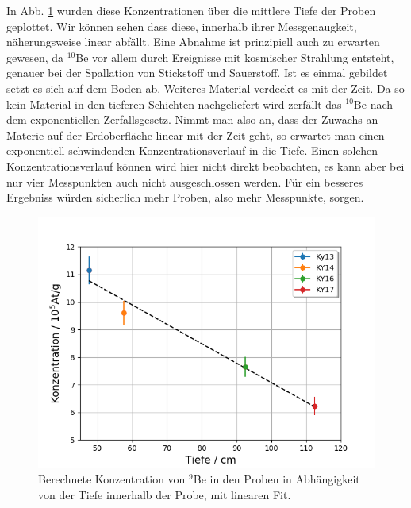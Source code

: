 In Abb. \ref{deep} wurden diese Konzentrationen über die mittlere Tiefe der Proben geplottet.
Wir können sehen dass diese, innerhalb ihrer Messgenaugkeit, näherungsweise linear abfällt.
Eine Abnahme ist prinzipiell auch zu erwarten gewesen, da $^{10}$Be vor allem durch Ereignisse mit kosmischer Strahlung entsteht, genauer bei der Spallation von Stickstoff und Sauerstoff.
Ist es einmal gebildet setzt es sich auf dem Boden ab.
Weiteres Material verdeckt es mit der Zeit.
Da so kein Material in den tieferen Schichten nachgeliefert wird zerfällt das $^{10}$Be nach dem exponentiellen Zerfallsgesetz.
Nimmt man also an, dass der Zuwachs an Materie auf der Erdoberfläche linear mit der Zeit geht, so erwartet man einen exponentiell schwindenden Konzentrationsverlauf in die Tiefe.
Einen solchen Konzentrationsverlauf können wird hier nicht direkt beobachten, es kann aber bei nur vier Messpunkten auch nicht ausgeschlossen werden.
Für ein besseres Ergebniss würden sicherlich mehr Proben, also mehr Messpunkte, sorgen.

\begin{figure}[ht]
  \centering
  \includegraphics[width=0.7\linewidth]{Pictures/10be_konzentration.png}
  \caption{Berechnete Konzentration von $^9$Be in den Proben in Abhängigkeit von der Tiefe innerhalb der Probe, mit linearen Fit.}
  \label{deep}
\end{figure}
\clearpage
